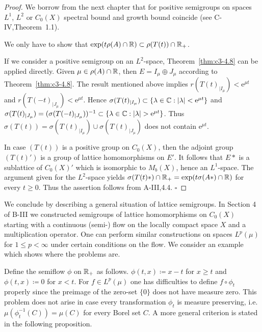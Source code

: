 \begin{proof} 
We borrow from the next chapter that for positive semigroups on
spaces $L^1$, $L^2$ or $C_0(X)$ spectral bound and growth bound coincide
(see C-IV,Theorem~1.1).

We only have to show that $\exp(t\rho(A) \cap \mathbb{R} ) \subset \rho(T(t)) \cap \mathbb{R} _+$.

If we consider a positive semigroup on an $L^2$-space, Theorem~\ref{thm:c3-4.8} can be
applied directly. Given $\mu \in \rho(A) \cap \mathbb{R} $, then $E = I_{\mu} \oplus J_{\mu}$ according to
Theorem~\ref{thm:c3-4.8}. The result mentioned above implies $r(T(t)_{|I_{\mu}}) < \mathrm{e}^{\mu t}$ and
$r(T(-t)_{|J_{\mu}}) < \mathrm{e}^{\mu t}$. Hence $\sigma(T(t)_{|I_{\mu}}) \subset \{\lambda \in \mathbb{C}  : |\lambda| < \mathrm{e}^{\mu t}\}$ and
$\sigma(T(t)_{|J_{\mu}}) = (\sigma(T(-t)_{|J_{\mu}}))^{-1} \subset \{\lambda \in \mathbb{C}  : |\lambda| > \mathrm{e}^{\mu t}\}$.
Thus $\sigma(T(t)) = \sigma(T(t)_{|I_{\mu}}) \cup \sigma(T(t)_{|J_{\mu}})$ does not contain $\mathrm{e}^{\mu t}$.

In case $(T(t))$ is a positive group on $C_0(X)$, then the adjoint
group $(T(t)')$ is a group of lattice homomorphisms on $E'$. It
follows that $E*$ is a sublattice of $C_0(X)'$ which is isomorphic to $M_b(X)$, hence an
$L^1$-space. 
The argument given for the $L^2$-space yields
$\sigma(T(t)*) \cap \mathbb{R} _+ = \exp(t\sigma(A*) \cap \mathbb{R} )$ for every $t \geq 0$. 
Thus the assertion follows from A-III,4.4.
$\square$
\end{proof}

We conclude by describing a general situation of lattice semigroups. 
In Section 4 of B-III we constructed semigroups of lattice
homomorphisms on $C_0(X)$ starting with a continuous (semi-) flow on the
locally compact space $X$ and a multiplication operator. 
One can perform similar constructions on spaces $L^p(\mu)$ for $1 \leq p < \infty$ under
certain conditions on the flow. 
We consider an example which shows where the problems are.

Define the semiflow $\phi$ on $\mathbb{R} _+$ as follows. 
$\phi(t,x) \coloneqq  x-t$ for $x \geq t$ and $\phi(t,x) \coloneqq  0$ for $x < t$. 
For $f \in L^p(\mu)$ one has difficulties to define $f \circ \phi_t$ properly since the preimage of the zero-set $\{0\}$ does
not have measure zero. This problem does not arise in case every
transformation $\phi_t$ is measure preserving, i.e. $\mu(\phi_t^{-1}(C)) = \mu(C)$
for every Borel set $C$. A more general criterion is stated in the
following proposition.

